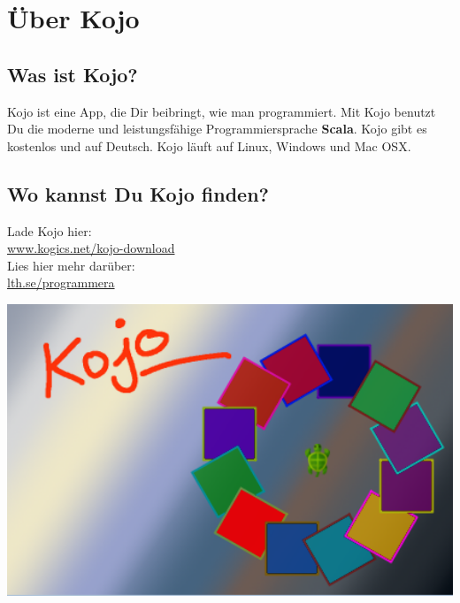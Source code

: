 \chapter{Über Kojo}
\begin{multicols}{2}
\section*{\color{black}Was ist Kojo?}
Kojo ist eine App, die Dir beibringt, wie man programmiert. Mit Kojo benutzt Du die moderne und leistungsfähige Programmiersprache {\bf\color{blue}Scala}. Kojo gibt es kostenlos und auf Deutsch. Kojo läuft auf Linux, Windows und Mac OSX.
\section*{\color{black}Wo kannst Du Kojo finden?}
Lade Kojo hier: 
\\

\href{http://www.kogics.net/kojo-download}{www.kogics.net/kojo-download}
\\

Lies hier mehr darüber: 
\\

\href{http://lth.se/programmera}{lth.se/programmera}

\columnbreak

\begin{center}
\includegraphics[width=14.0cm]{../img/kojo.png}
\end{center}

\end{multicols}

